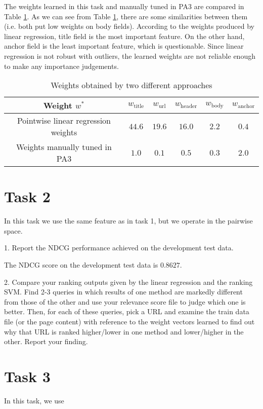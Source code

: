 The weights learned in this task and manually tuned in PA3 are compared in Table \ref{tab:wt}.
As we can see from Table \ref{tab:wt}, there are some similarities between them (i.e. both put low weights on body fields).
According to the weights produced by linear regression, title field is the most important feature. On the other hand,
anchor field is the least important feature, which is questionable. Since linear regression is not robust with outliers,
the learned weights are not reliable enough to make any importance judgements.
\begin{table}
\begin{center}
\begin{tabular}{|c|c|c|c|c|c|}
  \hline
  Weight $w^*$ & $w_\textrm{title}$ & $w_\textrm{url}$ & $w_\textrm{header}$ & $w_\textrm{body}$ & $w_\textrm{anchor}$ \\
  \hline
  Pointwise linear regression weights & $44.6$ & $19.6$ & $16.0$ & $2.2$ & $0.4$ \\
  \hline
  Weights manually tuned in PA3 & $1.0$ & $0.1$ & $0.5$ & $0.3$ & $2.0$ \\
  \hline
\end{tabular}
\caption{Weights obtained by two different approaches}\label{tab:wt}
\end{center}
\end{table}


\section{Task 2}
In this task we use the same feature as in task 1, but we operate in the pairwise space.

1. Report the NDCG performance achieved on the development test data.

The NDCG score on the development test data is $0.8627$.


2. Compare your ranking outputs given by the linear regression and the ranking SVM.
Find 2-3 queries in which results of one method are markedly different from those
of the other and use your relevance score file to judge which one is better.
Then, for each of these queries, pick a URL and examine the train data file (or the
page content) with reference to the weight vectors learned to find out why that
URL is ranked higher/lower in one method and lower/higher in the other. Report
your finding.



\section{Task 3}
In this task, we use 

